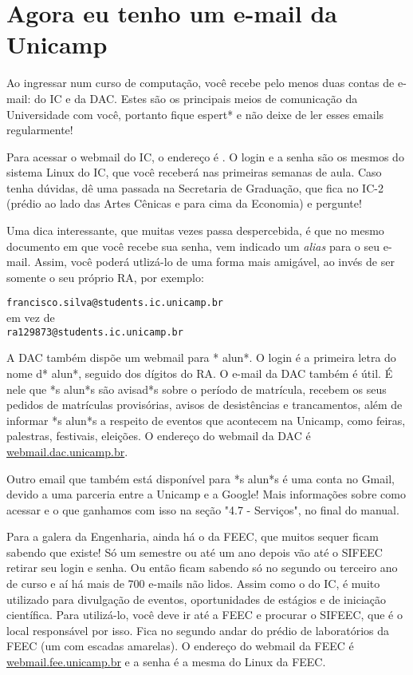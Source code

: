
\section{Agora eu tenho um e-mail da Unicamp}

Ao ingressar num curso de computação, você recebe pelo menos duas contas de
e-mail: do IC e da DAC. Estes são os principais meios de comunicação da
Universidade com você, portanto fique espert* e não deixe de ler esses emails
regularmente!

Para acessar o webmail do IC, o endereço é
.  O login e a senha são os
mesmos do sistema Linux do IC, que você receberá nas primeiras semanas de
aula. Caso tenha dúvidas, dê uma passada na Secretaria de Graduação, que fica no
IC-2 (prédio ao lado das Artes Cênicas e para cima da Economia) e pergunte!

Uma dica interessante, que muitas vezes passa despercebida, é que no mesmo
documento em que você recebe sua senha, vem indicado um {\it alias} para o seu
e-mail. Assim, você poderá utlizá-lo de uma forma mais amigável, ao invés de ser
somente o seu próprio RA, por exemplo:

\begin{center}
\texttt{francisco.silva@students.ic.unicamp.br}\\
em vez de\\
\texttt{ra129873@students.ic.unicamp.br}
\end{center}

A DAC também dispõe um webmail para * alun*. O login é a primeira letra do nome
d* alun*, seguido dos dígitos do RA. O e-mail da DAC também é útil. É nele que
*s alun*s são avisad*s sobre o período de matrícula, recebem os seus pedidos de
matrículas provisórias, avisos de desistências e trancamentos, além de informar
*s alun*s a respeito de eventos que acontecem na Unicamp, como feiras,
palestras, festivais, eleições. O endereço do webmail da DAC é
\url{webmail.dac.unicamp.br}.

Outro email que também está disponível para *s alun*s é uma conta no Gmail,
devido a uma parceria entre a Unicamp e a Google! Mais informações sobre como
acessar e o que ganhamos com isso na seção "4.7 - Serviços", no final do manual.

Para a galera da Engenharia, ainda há o da FEEC, que muitos sequer ficam
sabendo que existe! Só um semestre ou até um ano depois vão até o SIFEEC retirar
seu login e senha. Ou então ficam sabendo só no segundo ou terceiro ano de curso
e aí há mais de 700 e-mails não lidos. Assim como o do IC, é muito utilizado
para divulgação de eventos, oportunidades de estágios e de iniciação científica.
Para utilizá-lo, você deve ir até a FEEC e procurar o SIFEEC, que é o local
responsável por isso. Fica no segundo andar do prédio de laboratórios da FEEC
(um com escadas amarelas). O endereço do webmail da FEEC é
\url{webmail.fee.unicamp.br} e a senha é a mesma do Linux da FEEC.

